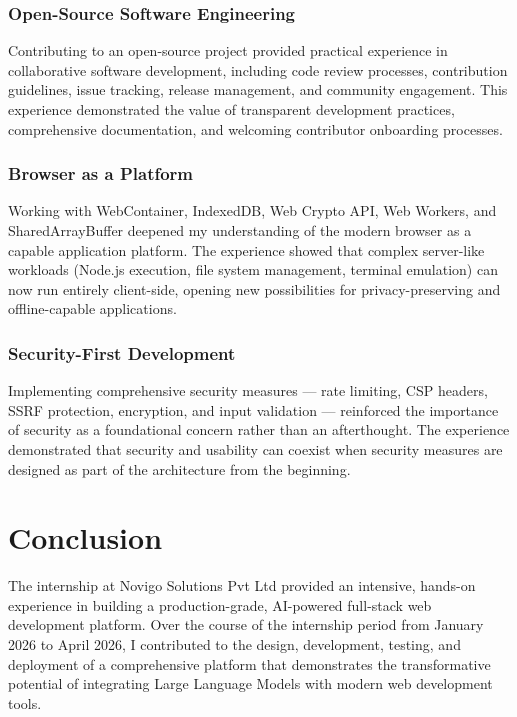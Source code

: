 \documentclass[12pt,a4paper,openany]{report}
\begin{document}
\subsection{Open-Source Software Engineering}
Contributing to an open-source project provided practical experience in collaborative software development, including code review processes, contribution guidelines, issue tracking, release management, and community engagement. This experience demonstrated the value of transparent development practices, comprehensive documentation, and welcoming contributor onboarding processes.

\subsection{Browser as a Platform}
Working with WebContainer, IndexedDB, Web Crypto API, Web Workers, and SharedArrayBuffer deepened my understanding of the modern browser as a capable application platform. The experience showed that complex server-like workloads (Node.js execution, file system management, terminal emulation) can now run entirely client-side, opening new possibilities for privacy-preserving and offline-capable applications.

\subsection{Security-First Development}
Implementing comprehensive security measures --- rate limiting, CSP headers, SSRF protection, encryption, and input validation --- reinforced the importance of security as a foundational concern rather than an afterthought. The experience demonstrated that security and usability can coexist when security measures are designed as part of the architecture from the beginning.

\chapter{Conclusion}

The internship at Novigo Solutions Pvt Ltd provided an intensive, hands-on experience in building a production-grade, AI-powered full-stack web development platform. Over the course of the internship period from January 2026 to April 2026, I contributed to the design, development, testing, and deployment of a comprehensive platform that demonstrates the transformative potential of integrating Large Language Models with modern web development tools.
\end{document}
